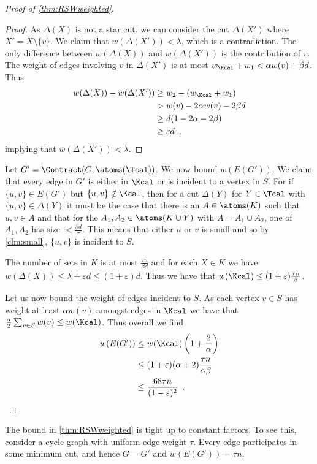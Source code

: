 \begin{proof}[Proof of \cref{thm:RSWweighted}]
\begin{proof}
As $\Delta(X)$ is not a star cut, we can consider the cut $\Delta(X')$ where $X' = X \setminus \{v\}$.  We claim that $w(\Delta(X')) < \lambda$, which is 
a contradiction.  The only difference between $w(\Delta(X))$ and $w(\Delta(X'))$ is the contribution of $v$.  The weight of edges involving $v$ in $\Delta(X')$ 
is at most $w_\Kcal + w_1 < \alpha w(v) + \beta d$.  Thus 
\begin{align*}
w(\Delta(X)) - w(\Delta(X')) &\ge w_2 - (w_\Kcal + w_1) \\
&> w(v) - 2\alpha w(v) - 2 \beta d \\
&\ge d(1-2\alpha - 2\beta) \\
&\ge \varepsilon d \enspace ,
\end{align*}
implying that $w(\Delta(X')) < \lambda$.
\end{proof}
Let $G' = \Contract(G, \atoms(\Tcal))$.  We now bound $w(E(G'))$.  We claim that every edge in $G'$ is either in $\Kcal$ or is incident to a vertex in $S$.  For if $\{u,v\} \in E(G')$ but $\{u,v\} \not \in \Kcal$, then for 
a cut $\Delta(Y)$ for $Y \in \Tcal$ with $\{u,v\} \in \Delta(Y)$ it must be the case that there is an $A \in \atoms(K)$ such that $u,v \in A$ and that for the $A_1, A_2 \in \atoms(K \cup Y)$ 
with $A = A_1 \cup A_2$, one of $A_1, A_2$ has size $< \frac{\beta d}{\tau}$.  This means that either $u$ or $v$ is small and so by \cref{clm:small}, $\{u,v\}$ is incident to $S$.  

The number of sets in $K$ is at most $\frac{\tau n}{\beta d}$ and for each $X \in K$ we have $w(\Delta(X)) \le \lambda + \varepsilon d \le (1+ \varepsilon) d$.  Thus 
we have that $w(\Kcal) \le (1+\varepsilon) \frac{\tau n}{\beta}$.  

Let us now bound the weight of edges incident to $S$.  As each vertex $v \in S$ has weight at least $\alpha w(v)$ amongst edges in $\Kcal$ we have that 
$\frac{\alpha}{2} \sum_{v \in S} w(v) \le w(\Kcal)$.  Thus overall we find 
\begin{align*}
w(E(G')) &\le w(\Kcal)\left( 1+ \frac{2}{\alpha}\right) \\
&\le (1+\varepsilon)(\alpha+2) \frac{\tau n}{\alpha \beta} \\
&\le \frac{68 \tau n}{(1-\varepsilon)^2} \enspace . \qedhere
\end{align*}
\end{proof}

The bound in \cref{thm:RSWweighted} is tight up to constant factors.
To see this, consider a cycle graph with uniform edge weight $\tau$.
Every edge participates in some minimum cut, and hence $G=G'$ and $w(E(G')) = \tau n$.



